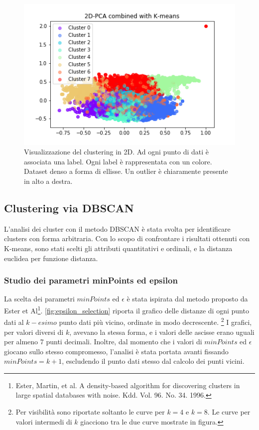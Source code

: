 \documentclass[10pt,a4paper,twocolumn]{article}
\begin{document}
\begin{figure}[hbtp]
\centering 
\includegraphics[width=1\columnwidth]{../images/pca_kmeans.png}
\caption{Visualizzazione del clustering in 2D. Ad ogni punto di dati è associata una label. Ogni label è rappresentata con un colore. Dataset denso a forma di ellisse. Un outlier è chiaramente presente in alto a destra.}
\label{fig:pca_kmeans}
\end{figure}

\subsection{Clustering via DBSCAN}
L'analisi dei cluster con il metodo DBSCAN è stata svolta per identificare clusters con forma arbitraria.
Con lo scopo di confrontare i risultati ottenuti con K-means, sono stati scelti gli attributi quantitativi e ordinali, e la distanza euclidea per funzione distanza.

\subsubsection{Studio dei parametri minPoints ed epsilon}
La scelta dei parametri $minPoints$ ed $\epsilon$ è stata ispirata dal metodo proposto da Ester et Al\footnote{Ester, Martin, et al. A density-based algorithm for discovering clusters in large spatial databases with noise. Kdd. Vol. 96. No. 34. 1996.}. 
\autoref{fig:epsilon_selection} riporta il grafico delle distanze di ogni punto dati al $k-esimo$ punto dati più vicino, ordinate in modo decrescente. 
\footnote{Per visibilità sono riportate soltanto le curve  per $k=4$ e $k=8$. Le curve per valori intermedi di $k$ giacciono tra le due curve mostrate in figura.}
I grafici, per valori diversi di $k$, avevano la stessa forma, e i valori delle ascisse erano uguali per almeno 7 punti decimali. Inoltre, dal momento che i valori di $minPoints$ ed $\epsilon$ giocano sullo stesso compromesso, l'analisi è stata portata avanti fissando $minPoints=k+1$, escludendo il punto dati stesso dal calcolo dei punti vicini.
\end{document}
